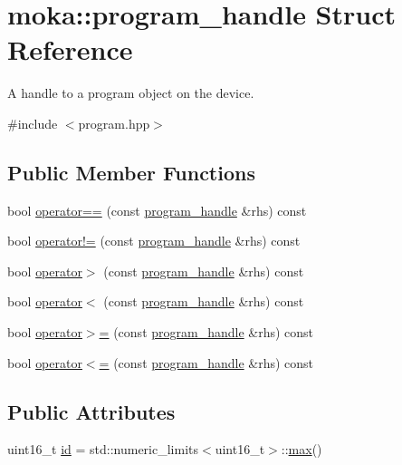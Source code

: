 \hypertarget{structmoka_1_1program__handle}{}\section{moka\+::program\+\_\+handle Struct Reference}
\label{structmoka_1_1program__handle}


A handle to a program object on the device.  




{\ttfamily \#include $<$program.\+hpp$>$}

\subsection*{Public Member Functions}
\begin{DoxyCompactItemize}
\item 
bool \mbox{\hyperlink{structmoka_1_1program__handle_adf3adcb48ddb694bb0c480413f657e68}{operator==}} (const \mbox{\hyperlink{structmoka_1_1program__handle}{program\+\_\+handle}} \&rhs) const
\item 
bool \mbox{\hyperlink{structmoka_1_1program__handle_a2588f54655c29f6db262bd357dcb5566}{operator!=}} (const \mbox{\hyperlink{structmoka_1_1program__handle}{program\+\_\+handle}} \&rhs) const
\item 
bool \mbox{\hyperlink{structmoka_1_1program__handle_a5a7894e919d9e88032cce7c535eaa365}{operator$>$}} (const \mbox{\hyperlink{structmoka_1_1program__handle}{program\+\_\+handle}} \&rhs) const
\item 
bool \mbox{\hyperlink{structmoka_1_1program__handle_a3ea181eb3dcf9328e541baecfdbe7337}{operator$<$}} (const \mbox{\hyperlink{structmoka_1_1program__handle}{program\+\_\+handle}} \&rhs) const
\item 
bool \mbox{\hyperlink{structmoka_1_1program__handle_aad662908b45e21d277df7ce9b6851213}{operator$>$=}} (const \mbox{\hyperlink{structmoka_1_1program__handle}{program\+\_\+handle}} \&rhs) const
\item 
bool \mbox{\hyperlink{structmoka_1_1program__handle_a8e91781438aaf79dffaa50092954f7bf}{operator$<$=}} (const \mbox{\hyperlink{structmoka_1_1program__handle}{program\+\_\+handle}} \&rhs) const
\end{DoxyCompactItemize}
\subsection*{Public Attributes}
\begin{DoxyCompactItemize}
\item 
uint16\+\_\+t \mbox{\hyperlink{structmoka_1_1program__handle_ab0a1eec073a076326b8a6f31848e9061}{id}} = std\+::numeric\+\_\+limits$<$uint16\+\_\+t$>$\+::\mbox{\hyperlink{namespacemoka_acf03408f89c521244763fb5f8746ce16a2ffe4e77325d9a7152f7086ea7aa5114}{max}}()
\end{DoxyCompactItemize}


